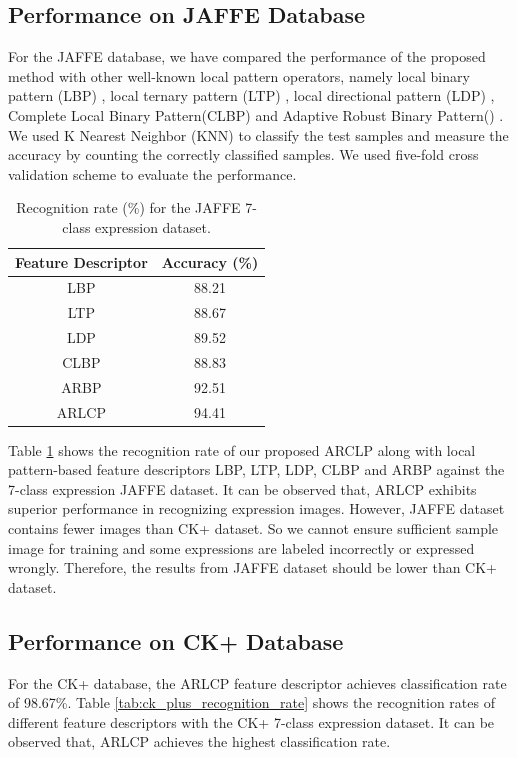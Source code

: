 \documentclass[12pt]{article}
\begin{document}
\subsection{Performance on JAFFE Database}
For the JAFFE database, we have compared the performance of the proposed method with other well-known local pattern operators, namely local binary pattern (LBP) \cite{shan2005robust}, local ternary pattern (LTP) \cite{tan2010enhanced}, local directional pattern (LDP) \cite{jabid2010robust}, Complete Local Binary Pattern(CLBP)\cite{clbp01} and Adaptive Robust Binary Pattern(\cite{arbp01}) . We used K Nearest Neighbor (KNN) to classify the test samples and measure the accuracy by counting  the correctly classified samples. We used five-fold cross validation scheme to evaluate the performance.

\begin{table}[H]
	\begin{center}
		\caption{Recognition rate (\%) for the JAFFE 7-class expression dataset.}
		\begin{tabular}{|c|c|}
			
			\hline
			\textbf{Feature Descriptor } & \textbf{Accuracy (\%)}\\
			\hline
			LBP & 88.21 \\
			LTP & 88.67 \\
			LDP & 89.52 \\
			CLBP & 88.83 \\
			ARBP & 92.51 \\
			ARLCP & 94.41 \\
			\hline
			
		\end{tabular}
		 
		\label{tab:jaffe_recognition_rate}
	\end{center}
\end{table}


\noindent Table \ref{tab:jaffe_recognition_rate} shows the recognition rate of our proposed ARCLP along with local pattern-based feature descriptors LBP, LTP, LDP, CLBP and ARBP against the 7-class expression JAFFE dataset. It can be observed that, ARLCP exhibits superior performance in recognizing expression images. However, JAFFE dataset contains fewer images than CK+ dataset. So we cannot ensure sufficient sample image for training and some expressions are labeled incorrectly or expressed wrongly. Therefore, the results from JAFFE dataset should be lower than CK+ dataset.

\subsection{Performance on CK+ Database}
For the CK+ database, the ARLCP feature descriptor achieves classification rate
of 98.67\%. Table \ref{tab:ck_plus_recognition_rate} shows the recognition rates of different feature
descriptors with the CK+ 7-class expression dataset. It can be observed that, ARLCP achieves the highest classification rate.
\end{document}
